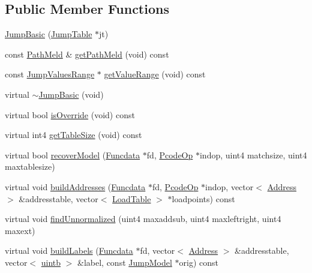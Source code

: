 \subsection*{Public Member Functions}
\begin{DoxyCompactItemize}
\item 
\mbox{\hyperlink{class_jump_basic_a9466142848f0ca24f2626f783a0012cb}{Jump\+Basic}} (\mbox{\hyperlink{class_jump_table}{Jump\+Table}} $\ast$jt)
\item 
const \mbox{\hyperlink{class_path_meld}{Path\+Meld}} \& \mbox{\hyperlink{class_jump_basic_aa345cf2327b7e4214c1b7e81212b3ab1}{get\+Path\+Meld}} (void) const
\item 
const \mbox{\hyperlink{class_jump_values_range}{Jump\+Values\+Range}} $\ast$ \mbox{\hyperlink{class_jump_basic_afcd2c65a719d7d429f583793b25e781c}{get\+Value\+Range}} (void) const
\item 
virtual \mbox{\hyperlink{class_jump_basic_a898b7d5f24ef907f46bcc642fdfa4ffa}{$\sim$\+Jump\+Basic}} (void)
\item 
virtual bool \mbox{\hyperlink{class_jump_basic_a9f923a2aaeb571981a8ae758670d20f5}{is\+Override}} (void) const
\item 
virtual int4 \mbox{\hyperlink{class_jump_basic_abef7f04911739ec301f393f072a1c9c5}{get\+Table\+Size}} (void) const
\item 
virtual bool \mbox{\hyperlink{class_jump_basic_aebf055ad4baf1a138107d8dd3a40c809}{recover\+Model}} (\mbox{\hyperlink{class_funcdata}{Funcdata}} $\ast$fd, \mbox{\hyperlink{class_pcode_op}{Pcode\+Op}} $\ast$indop, uint4 matchsize, uint4 maxtablesize)
\item 
virtual void \mbox{\hyperlink{class_jump_basic_a42533b11d12a5f819bb88abb21037d94}{build\+Addresses}} (\mbox{\hyperlink{class_funcdata}{Funcdata}} $\ast$fd, \mbox{\hyperlink{class_pcode_op}{Pcode\+Op}} $\ast$indop, vector$<$ \mbox{\hyperlink{class_address}{Address}} $>$ \&addresstable, vector$<$ \mbox{\hyperlink{class_load_table}{Load\+Table}} $>$ $\ast$loadpoints) const
\item 
virtual void \mbox{\hyperlink{class_jump_basic_a2d542e5a6b74bd116d89ba4e5bb4da9b}{find\+Unnormalized}} (uint4 maxaddsub, uint4 maxleftright, uint4 maxext)
\item 
virtual void \mbox{\hyperlink{class_jump_basic_ad3c8a1257f973c18e25935ee932076c4}{build\+Labels}} (\mbox{\hyperlink{class_funcdata}{Funcdata}} $\ast$fd, vector$<$ \mbox{\hyperlink{class_address}{Address}} $>$ \&addresstable, vector$<$ \mbox{\hyperlink{types_8h_a2db313c5d32a12b01d26ac9b3bca178f}{uintb}} $>$ \&label, const \mbox{\hyperlink{class_jump_model}{Jump\+Model}} $\ast$orig) const

\end{DoxyCompactItemize}
